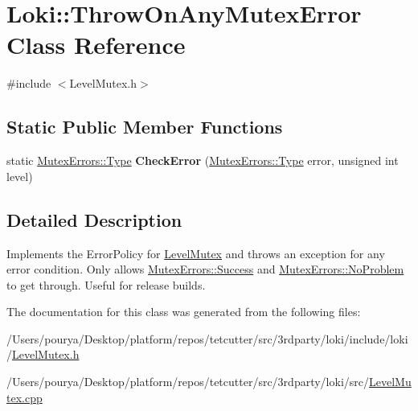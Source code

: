 \hypertarget{classLoki_1_1ThrowOnAnyMutexError}{}\section{Loki\+:\+:Throw\+On\+Any\+Mutex\+Error Class Reference}
\label{classLoki_1_1ThrowOnAnyMutexError}


{\ttfamily \#include $<$Level\+Mutex.\+h$>$}

\subsection*{Static Public Member Functions}
\begin{DoxyCompactItemize}
\item 
\hypertarget{classLoki_1_1ThrowOnAnyMutexError_ab031a43e268c6aca1b1110367a8a0f0d}{}static \hyperlink{classLoki_1_1MutexErrors_acd0eb6065ca303083d2e0229d7bff590}{Mutex\+Errors\+::\+Type} {\bfseries Check\+Error} (\hyperlink{classLoki_1_1MutexErrors_acd0eb6065ca303083d2e0229d7bff590}{Mutex\+Errors\+::\+Type} error, unsigned int level)\label{classLoki_1_1ThrowOnAnyMutexError_ab031a43e268c6aca1b1110367a8a0f0d}

\end{DoxyCompactItemize}


\subsection{Detailed Description}
Implements the Error\+Policy for \hyperlink{classLoki_1_1LevelMutex}{Level\+Mutex} and throws an exception for any error condition. Only allows \hyperlink{classLoki_1_1MutexErrors_acd0eb6065ca303083d2e0229d7bff590a6a170657856ec38decc1a2f1d39406fa}{Mutex\+Errors\+::\+Success} and \hyperlink{classLoki_1_1MutexErrors_acd0eb6065ca303083d2e0229d7bff590ae009e53bdca8c073b62350b8ba168bfd}{Mutex\+Errors\+::\+No\+Problem} to get through. Useful for release builds. 

The documentation for this class was generated from the following files\+:\begin{DoxyCompactItemize}
\item 
/\+Users/pourya/\+Desktop/platform/repos/tetcutter/src/3rdparty/loki/include/loki/\hyperlink{LevelMutex_8h}{Level\+Mutex.\+h}\item 
/\+Users/pourya/\+Desktop/platform/repos/tetcutter/src/3rdparty/loki/src/\hyperlink{LevelMutex_8cpp}{Level\+Mutex.\+cpp}\end{DoxyCompactItemize}
